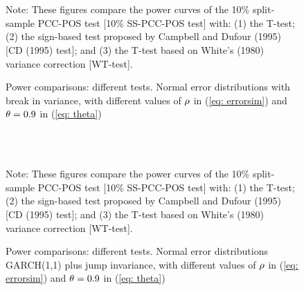 \documentclass[harvard,11pt]{article}
\begin{document}
\begin{figure}[tbph]
\caption{Power comparisons: different tests. Normal error distributions with break in variance,
with different values of $\protect\rho $ in (\protect\ref{eq: errorsim}) and $\protect%
\theta =0.9$ in (\protect\ref{eq: theta})}
\begin{center}
 \\[0pt]
\\[0pt]
\end{center}
\doublespacing
Note: These figures compare the power curves of the 10\% split-sample PCC-POS test
[10\% SS-PCC-POS test] with: (1) the T-test; (2) the sign-based test
proposed by Campbell and Dufour (1995) [CD (1995) test]; and (3) the T-test based
on White's (1980) variance correction [WT-test].
\label{fig: Sim511}
\end{figure}



\begin{figure}[tbph]
\caption{Power comparisons: different tests. Normal error distributions GARCH(1,1) plus jump invariance, with
different values of $\protect\rho $ in (\protect\ref{eq: errorsim}) and $\protect%
\theta =0.9$ in (\protect\ref{eq: theta})}
\begin{center}
 \\[0pt]
\\[0pt]
\end{center}
\doublespacing
Note: These figures compare the power curves of the 10\% split-sample PCC-POS test
[10\% SS-PCC-POS test] with: (1) the T-test; (2) the sign-based test
proposed by Campbell and Dufour (1995) [CD (1995) test]; and (3) the T-test based
on White's (1980) variance correction [WT-test]. 
\label{fig: Sim612}
\end{figure}
\FloatBarrier
\end{document}
